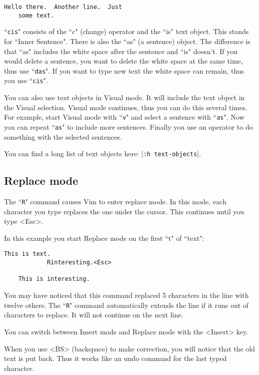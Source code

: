 \begin{Verbatim}[samepage=true]
    Hello there.  Another line.  Just 
    some text. 
\end{Verbatim}

``\texttt{cis}" consists of the ``c" (change) operator and the ``is" text object.
This stands for ``Inner Sentence".
There is also the ``as" (a sentence) object.
The difference is that ``as" includes the white space after the sentence and ``is" doesn't.
If you would delete a sentence, you want to delete the white space at the same time, thus use ``\texttt{das}".
If you want to type new text the white space can remain, thus you use ``\texttt{cis}".

You can also use text objects in Visual mode.
It will include the text object in the Visual selection.
Visual mode continues, thus you can do this several times.
For example, start Visual mode with ``\texttt{v}" and select a sentence with ``\texttt{as}".
Now you can repeat ``\texttt{as}" to include more sentences.
Finally you use an operator to do something with the selected sentences.

You can find a long list of text objects here: |\texttt{:h text-objects}|.

\subsection{Replace mode}
\label{Replace mode}

The ``\texttt{R}" command causes Vim to enter replace mode.
In this mode, each character you type replaces the one under the cursor.
This continues until you type <Esc>.

In this example you start Replace mode on the first ``t" of ``text":

\begin{Verbatim}[samepage=true]
    This is text. 
            Rinteresting.<Esc>

    This is interesting. 
\end{Verbatim}

You may have noticed that this command replaced 5 characters in the line with twelve others.
The ``\texttt{R}" command automatically extends the line if it runs out of characters to replace.
It will not continue on the next line.

You can switch between Insert mode and Replace mode with the <Insert> key.

When you use <BS> (backspace) to make correction, you will notice that the old text is put back.
Thus it works like an undo command for the last typed character.

